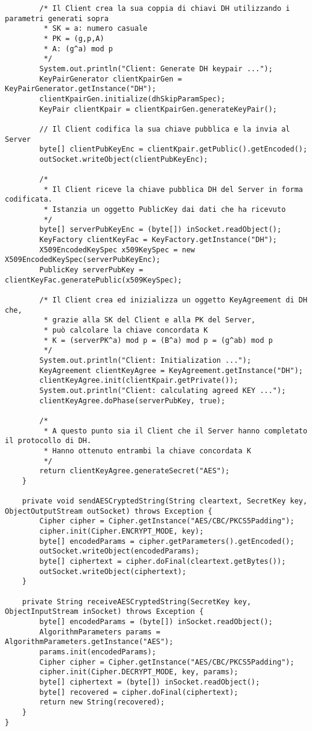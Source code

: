 \documentclass[12pt]{article}
\begin{document}
\begin{lstlisting}
		/* Il Client crea la sua coppia di chiavi DH utilizzando i parametri generati sopra
		 * SK = a: numero casuale
		 * PK = (g,p,A)
		 * A: (g^a) mod p
		 */
		System.out.println("Client: Generate DH keypair ...");
		KeyPairGenerator clientKpairGen = KeyPairGenerator.getInstance("DH");
		clientKpairGen.initialize(dhSkipParamSpec);
		KeyPair clientKpair = clientKpairGen.generateKeyPair();

		// Il Client codifica la sua chiave pubblica e la invia al Server
		byte[] clientPubKeyEnc = clientKpair.getPublic().getEncoded();
		outSocket.writeObject(clientPubKeyEnc);

		/*
		 * Il Client riceve la chiave pubblica DH del Server in forma codificata.
		 * Istanzia un oggetto PublicKey dai dati che ha ricevuto
		 */
		byte[] serverPubKeyEnc = (byte[]) inSocket.readObject();
		KeyFactory clientKeyFac = KeyFactory.getInstance("DH");
		X509EncodedKeySpec x509KeySpec = new X509EncodedKeySpec(serverPubKeyEnc);
		PublicKey serverPubKey = clientKeyFac.generatePublic(x509KeySpec);

		/* Il Client crea ed inizializza un oggetto KeyAgreement di DH che,
		 * grazie alla SK del Client e alla PK del Server,
		 * può calcolare la chiave concordata K
		 * K = (serverPK^a) mod p = (B^a) mod p = (g^ab) mod p
		 */
		System.out.println("Client: Initialization ...");
		KeyAgreement clientKeyAgree = KeyAgreement.getInstance("DH");
		clientKeyAgree.init(clientKpair.getPrivate());
		System.out.println("Client: calculating agreed KEY ...");
		clientKeyAgree.doPhase(serverPubKey, true);

		/*
		 * A questo punto sia il Client che il Server hanno completato il protocollo di DH.
		 * Hanno ottenuto entrambi la chiave concordata K
		 */
		return clientKeyAgree.generateSecret("AES");
	}

	private void sendAESCryptedString(String cleartext, SecretKey key, ObjectOutputStream outSocket) throws Exception {
		Cipher cipher = Cipher.getInstance("AES/CBC/PKCS5Padding");
		cipher.init(Cipher.ENCRYPT_MODE, key);
		byte[] encodedParams = cipher.getParameters().getEncoded();
		outSocket.writeObject(encodedParams);
		byte[] ciphertext = cipher.doFinal(cleartext.getBytes());
		outSocket.writeObject(ciphertext);
	}

	private String receiveAESCryptedString(SecretKey key, ObjectInputStream inSocket) throws Exception {
		byte[] encodedParams = (byte[]) inSocket.readObject();
		AlgorithmParameters params = AlgorithmParameters.getInstance("AES");
		params.init(encodedParams);
		Cipher cipher = Cipher.getInstance("AES/CBC/PKCS5Padding");
		cipher.init(Cipher.DECRYPT_MODE, key, params);
		byte[] ciphertext = (byte[]) inSocket.readObject();
		byte[] recovered = cipher.doFinal(ciphertext);
		return new String(recovered);
	}
}
\end{lstlisting}
\end{document}
